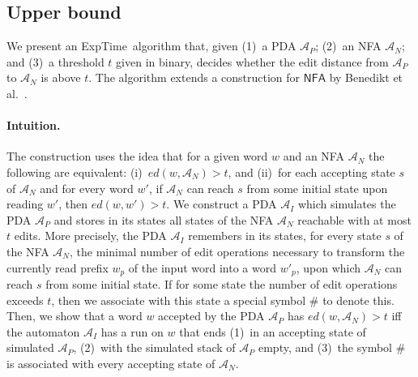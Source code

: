 \documentclass{CSML}
\newcommand{\aut}{\mathcal{A}}
\newcommand{\EXPTIME}{\textsf{ExpTime}}
\newcommand{\NFA}{\mathsf{NFA}}
\newcommand{\ed}{ed}
\begin{document}
\subsection{Upper bound}
\label{sec:upperBoundTED}

We present an \EXPTIME\ algorithm that, given (1)~a PDA $\aut_P$; 
(2)~an NFA $\aut_N$; and (3)~a threshold $t$ given in  binary, decides whether 
the edit distance from $\aut_P$ to $\aut_N$ is above $t$.
The algorithm extends a construction for $\NFA$ by Benedikt et al.~\cite{riveros}.

\paragraph{Intuition.}
The construction uses the idea that for a given word $w$ and an NFA $\aut_N$ 
the following are equivalent: 
(i)~$\ed(w,\aut_N) > t$, and 
(ii)~for each accepting state $s$ of $\aut_N$ and for every word $w'$, if 
  $\aut_N$ can reach $s$ from some initial state upon reading $w'$, then $\ed(w,w') > t$.
We construct a PDA $\aut_I$ which simulates the PDA $\aut_P$ and stores in its states all
states of the NFA $\aut_N$ reachable with at most $t$ edits. 
More precisely, the PDA $\aut_I$ remembers in its states, for every state $s$ of the NFA $\aut_N$,
the minimal number of edit operations necessary to transform the currently read prefix $w_p$ of the input word 
into a word $w'_p$, upon which $\aut_N$ can reach $s$ from some initial state. 
If for some state the number of edit operations exceeds $t$, 
then we associate with this state a special symbol $\#$ to denote this.
Then, we show that a word $w$ accepted by the 
PDA $\aut_P$ has $\ed(w,\aut_N) > t$ iff the automaton $\aut_I$ has a run on $w$
that ends (1)~in an accepting state of simulated $\aut_P$, 
(2)~with the simulated stack of $\aut_P$ empty, and 
(3)~the symbol $\#$ is associated with every accepting state of $\aut_N$.
\end{document}

